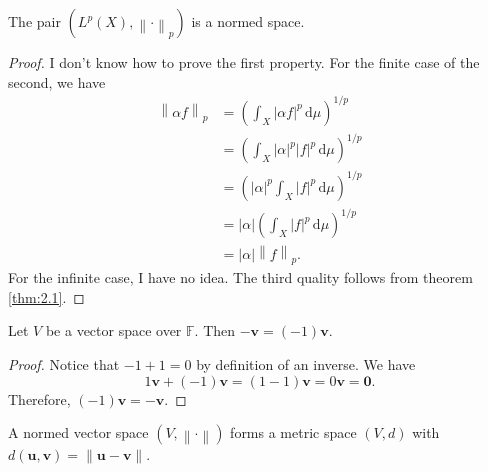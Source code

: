 \documentclass[11pt, letterpaper]{report}
\begin{document}
\begin{proposition}\label{prp:2.2}
	The pair $\left( L^p(X),\left\lVert \cdot  \right\rVert _p \right) $ is a normed space.
\end{proposition}
\begin{proof}
	I don't know how to prove the first property. For the finite case of the second, we have
	\begin{align*}
		\left\lVert \alpha f \right\rVert_p&=\left(\int_X \left| \alpha f \right|^p \,\mathrm{d} \mu \right)^{1 /p}\\
						   &=\left( \int_X \left| \alpha  \right| ^p\left| f \right| ^p \,\mathrm{d} \mu  \right) ^{1/p}\\
						   &=\left( \left| \alpha  \right| ^p \int_X \left| f \right|^p  \,\mathrm{d}\mu   \right) ^{1 /p}\\
						   &=\left| \alpha  \right|  \left( \int_X \left| f \right| ^p \,\mathrm{d} \mu  \right) ^{1 /p}\\
						   &=\left| \alpha  \right| \left\lVert f \right\rVert _p
	.\end{align*}
	For the infinite case, I have no idea. The third quality follows from theorem \ref{thm:2.1}.
\end{proof}
\begin{lemma}\label{lma:2.2}
	Let  $V$ be a vector space over $\mathbb{F}$. Then $-\mathbf{v}=(-1)\mathbf{v}$.
\end{lemma}
\begin{proof}
	Notice that $-1+1=0$ by definition of an inverse. We have
	\[
		1\mathbf{v}+(-1)\mathbf{v}=(1-1)\mathbf{v}=0\mathbf{v}=\mathbf{0}
	.\]
	Therefore, $(-1)\mathbf{v}=-\mathbf{v}$.
\end{proof}
\begin{proposition}\label{prp:2.3}
	A normed vector space $(V,\left\lVert \cdot  \right\rVert )$ forms a metric space $(V,d)$ with $d(\mathbf{u},\mathbf{v})=\left\lVert \mathbf{u}-\mathbf{v} \right\rVert $.
\end{proposition}
\end{document}
